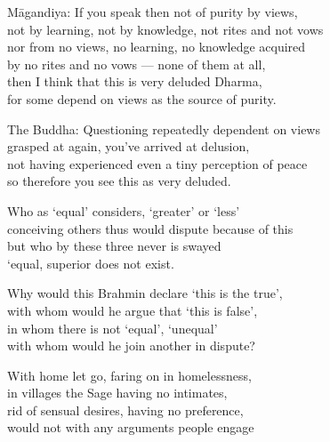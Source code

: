 \begin{MyDescription}{M\=agandiya:}
If you speak then not of purity by views,\\
not by learning, not by knowledge, not rites and not vows\\
nor from no views, no learning, no knowledge acquired\\
by no rites and no vows — none of them at all,\\
then I think that this is very deluded Dharma,\\
for some depend on views as the source of purity.
\end{MyDescription} 

\begin{MyDescription}{The Buddha:}
Questioning repeatedly dependent on views\\
grasped at again, you've arrived at delusion,\\
not having experienced even a tiny perception of peace\\
so therefore you see this as very deluded.
\end{MyDescription} 

\begin{MyDescription}{}
Who as `equal' considers, `greater' or `less'\\
conceiving others thus would dispute because of this\\
but who by these three never is swayed\\
`equal, superior does not exist.
\end{MyDescription} 
   
\begin{MyDescription}{}
Why would this Brahmin declare `this is the true',\\
with whom would he argue that `this is false',\\
in whom there is not `equal', `unequal'\\
with whom would he join another in dispute?
\end{MyDescription} 

\begin{MyDescription}{}
With home let go, faring on in homelessness,\\
in villages the Sage having no intimates,\\
rid of sensual desires, having no preference,\\
would not with any arguments people engage
\end{MyDescription} 

